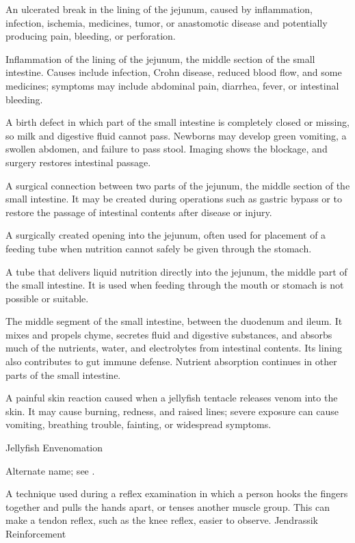  An ulcerated break in the lining of the jejunum, caused by inflammation, infection, ischemia, medicines, tumor, or anastomotic disease and potentially producing pain, bleeding, or perforation.

 Inflammation of the lining of the jejunum, the middle section of the small intestine. Causes include infection, Crohn disease, reduced blood flow, and some medicines; symptoms may include abdominal pain, diarrhea, fever, or intestinal bleeding.

 A birth defect in which part of the small intestine is completely closed or missing, so milk and digestive fluid cannot pass. Newborns may develop green vomiting, a swollen abdomen, and failure to pass stool. Imaging shows the blockage, and surgery restores intestinal passage.

 A surgical connection between two parts of the jejunum, the middle section of the small intestine. It may be created during operations such as gastric bypass or to restore the passage of intestinal contents after disease or injury.

 A surgically created opening into the jejunum, often used for placement of a feeding tube when nutrition cannot safely be given through the stomach.

 A tube that delivers liquid nutrition directly into the jejunum, the middle part of the small intestine. It is used when feeding through the mouth or stomach is not possible or suitable.

 The middle segment of the small intestine, between the duodenum and ileum. It
mixes and propels chyme, secretes fluid and digestive substances, and absorbs much of the nutrients,
water, and electrolytes from intestinal contents. Its lining also contributes to gut immune defense.
Nutrient absorption continues in other parts of the small intestine.

 A painful skin reaction caused when a jellyfish tentacle releases venom into the skin. It may cause burning, redness, and raised lines; severe exposure can cause vomiting, breathing trouble, fainting, or widespread symptoms.

\synonyms
Jellyfish Envenomation

 Alternate name; see .

 A technique used during a reflex examination in which a person hooks the fingers together and pulls the hands apart, or tenses another muscle group. This can make a tendon reflex, such as the knee reflex, easier to observe.
\synonyms
Jendrassik Reinforcement

